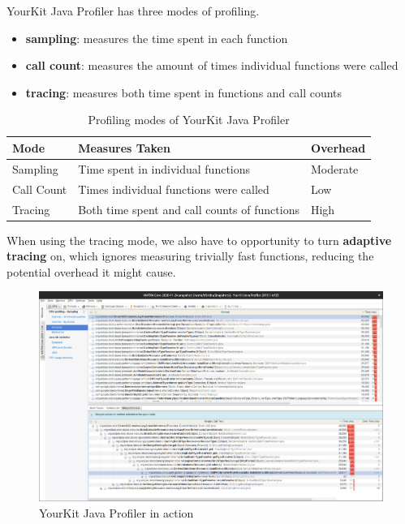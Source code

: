 \documentclass[11pt,a4paper,oneside]{report}
\begin{document}
YourKit Java Profiler has three modes of profiling.
\begin{itemize}
    \item{\textbf{sampling}: measures the time spent in each function}
    \item{\textbf{call count}: measures the amount of times individual functions were called}
    \item{\textbf{tracing}: measures both time spent in functions and call counts}
\end{itemize}

\begin{table}[ht]
    \footnotesize
    \centering
    \begin{tabular}{ l l l }
        \toprule
        Mode & Measures Taken & Overhead \\
        \midrule
        Sampling & Time spent in individual functions & Moderate \\
        Call Count & Times individual functions were called & Low \\
        Tracing & Both time spent and call counts of functions & High \\
        \bottomrule
    \end{tabular}
    \caption{Profiling modes of YourKit Java Profiler}
    \label{tab:profiler-modes}
\end{table}

When using the tracing mode, we also have to opportunity to turn
\textbf{adaptive tracing} on, which ignores measuring trivially fast functions,
reducing the potential overhead it might cause.

\begin{figure}[ht]
\centering
\includegraphics[width=150mm, keepaspectratio]{figures/yourkit-profiler.png}
\caption{YourKit Java Profiler in action}
\label{fig:yourkit-profiler}
\end{figure}
\end{document}
